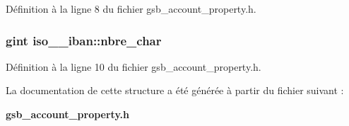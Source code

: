 Définition à la ligne 8 du fichier gsb\_\-account\_\-property.h.

\subsubsection[{nbre\_\-char}]{\setlength{\rightskip}{0pt plus 5cm}gint {\bf iso\_\_\-iban::nbre\_\-char}}\label{structiso__13616__iban_a0a0c4665c0f840d826d2f790a8e9f9ac}


Définition à la ligne 10 du fichier gsb\_\-account\_\-property.h.



La documentation de cette structure a été générée à partir du fichier suivant :\begin{DoxyCompactItemize}
\item 
{\bf gsb\_\-account\_\-property.h}\end{DoxyCompactItemize}
